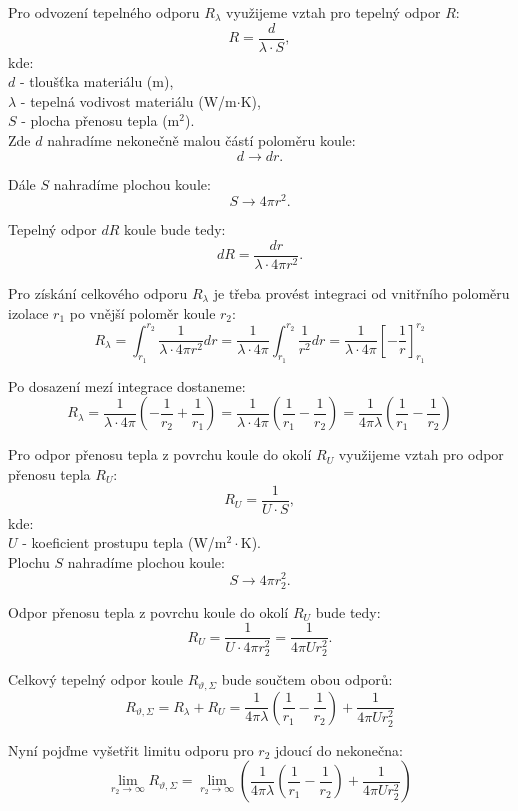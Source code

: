 \documentclass{article}
\begin{document}
Pro odvození tepelného odporu $R_{\lambda}$ využijeme vztah pro tepelný odpor $R$:
$$
    R = \frac{d}{\lambda \cdot S},
$$
kde:\\
$d$ - tloušťka materiálu (m),\\
$\lambda$ - tepelná vodivost materiálu (W/m$\cdot$K),\\
$S$ - plocha přenosu tepla (m$^2$).\\

Zde $d$ nahradíme nekonečně malou částí poloměru koule:
$$
    d \rightarrow dr.
$$

Dále $S$ nahradíme plochou koule:
$$
    S \rightarrow 4 \pi r^2.
$$

Tepelný odpor $dR$ koule bude tedy:
$$
    dR = \frac{dr}{\lambda \cdot 4 \pi r^2}.
$$

Pro získání celkového odporu $R_{\lambda}$ je třeba provést integraci od vnitřního poloměru izolace $r_1$ po vnější poloměr koule $r_2$:
$$
    R_{\lambda} = \int_{r_1}^{r_2} \frac{1}{\lambda \cdot 4 \pi r^2} dr = \frac{1}{\lambda \cdot 4 \pi} \int_{r_1}^{r_2} \frac{1}{r^2} dr = \frac{1}{\lambda \cdot 4 \pi} \left[ -\frac{1}{r} \right]_{r_1}^{r_2}
$$

Po dosazení mezí integrace dostaneme:
$$
    R_{\lambda} = \frac{1}{\lambda \cdot 4 \pi} \left( -\frac{1}{r_2} + \frac{1}{r_1} \right) = \frac{1}{\lambda \cdot 4 \pi} \left( \frac{1}{r_1} - \frac{1}{r_2} \right) = \frac{1}{4 \pi \lambda} \left( \frac{1}{r_1} - \frac{1}{r_2} \right)
$$

Pro odpor přenosu tepla z povrchu koule do okolí $R_{U}$ využijeme vztah pro odpor přenosu tepla $R_{U}$:
$$
    R_{U} = \frac{1}{U \cdot S},
$$
kde:\\
$U$ - koeficient prostupu tepla (W/m$^2 \cdot$K).\\

Plochu $S$ nahradíme plochou koule:
$$
    S \rightarrow 4 \pi r_2^2.
$$

Odpor přenosu tepla z povrchu koule do okolí $R_{U}$ bude tedy:
$$
    R_{U} = \frac{1}{U \cdot 4 \pi r_2^2} = \frac{1}{4 \pi U r_2^2}.
$$

Celkový tepelný odpor koule $R_{\vartheta,\Sigma}$ bude součtem obou odporů:
$$
    R_{\vartheta,\Sigma} = R_{\lambda} + R_{U} = \frac{1}{4 \pi \lambda} \left( \frac{1}{r_1} - \frac{1}{r_2} \right) + \frac{1}{4 \pi U r_2^2}
$$

Nyní pojďme vyšetřit limitu odporu pro $r_2$ jdoucí do nekonečna:
$$
    \lim_{r_2 \to \infty} R_{\vartheta,\Sigma} = \lim_{r_2 \to \infty} \left( \frac{1}{4 \pi \lambda} \left( \frac{1}{r_1} - \frac{1}{r_2} \right) + \frac{1}{4 \pi U r_2^2} \right)
$$
\end{document}
